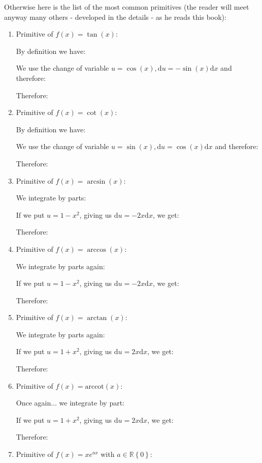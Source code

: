 	Otherwise here is the list of the most common primitives (the reader will meet anyway many others - developed in the details - as he reads this book):
	\begin{enumerate}
		\item Primitive of $f(x)=\tan (x)$:
		
		By definition we have:
		
		We use the change of variable $u=\cos(x),\mathrm{d}u=-\sin(x)\mathrm{d}x$ and therefore:
		
		Therefore:
		
		\item Primitive of $f(x)=\cot(x)$:
		
		By definition we have:
		
		We use the change of variable $u=\sin(x),\mathrm{d}u=\cos(x)\mathrm{d}x$ and therefore:
		 
		Therefore:
		
		\item Primitive of $f(x)=\arcsin(x)$:
		
		We integrate by parts:
		
		If we put $u=1-x^2$, giving us $\mathrm{d}u=-2x\mathrm{d}x$, we get:
		
		Therefore:
		
		\item Primitive of $f(x)=\arccos(x)$:
		
		We integrate by parts again:
		
		If we put $u=1-x^2$, giving us $\mathrm{d}u=-2x\mathrm{d}x$, we get:
		
		Therefore:
		
		\item Primitive of $f(x)=\arctan(x)$:
		
		We integrate by parts again:
		
		If we put $u=1+x^2$, giving us $\mathrm{d}u=2x\mathrm{d}x$, we get:
		
		Therefore:
		
		\item Primitive of $f(x)=\text{arccot}(x)$:
		
		Once again... we integrate by part:
		
		If we put $u=1+x^2$, giving us $\mathrm{d}u=2x\mathrm{d}x$, we get:
		
		Therefore:
		
		\item Primitive of $f(x)=xe^{ax}$ with $a\in \mathbb{R}\left\lbrace 0 \right\rbrace$:
		

\end{enumerate}
